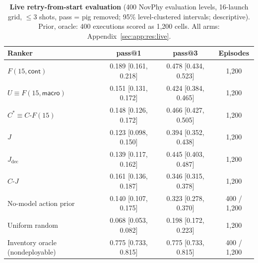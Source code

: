 \begin{table}[t]
\begin{revblock}
\centering
\footnotesize
\setlength{\tabcolsep}{3pt}
\caption{\textbf{Live retry-from-start evaluation} (400 NovPhy evaluation levels, 16-launch grid, $\le$3 shots, pass = pig removed; 95\% level-clustered intervals; descriptive). Prior, oracle: 400 executions scored as 1,200 cells. All arms: Appendix~\ref{sec:app:res:live}.}
\label{tab:res:live}
\begin{tabular}{@{}lccc@{}}
\toprule
Ranker & pass@1 & pass@3 & Episodes \\
\midrule
$F(15,\textsf{cont})$ & 0.189 [0.161, 0.218] & 0.478 [0.434, 0.523] & 1,200 \\
$U\equiv F(15,\textsf{macro})$ & 0.151 [0.131, 0.172] & 0.424 [0.384, 0.465] & 1,200 \\
$C^{*}\equiv C\text{-}F(15)$ & 0.148 [0.126, 0.172] & 0.466 [0.427, 0.505] & 1,200 \\
$J$ & 0.123 [0.098, 0.150] & 0.394 [0.352, 0.438] & 1,200 \\
$J_{\mathrm{dec}}$ & 0.139 [0.117, 0.162] & 0.445 [0.403, 0.487] & 1,200 \\
$C\text{-}J$ & 0.161 [0.136, 0.187] & 0.346 [0.315, 0.378] & 1,200 \\
No-model action prior & 0.140 [0.107, 0.175] & 0.323 [0.278, 0.370] & 400 / 1,200 \\
Uniform random & 0.068 [0.053, 0.082] & 0.198 [0.172, 0.223] & 1,200 \\
Inventory oracle (nondeployable) & 0.775 [0.733, 0.815] & 0.775 [0.733, 0.815] & 400 / 1,200 \\
\bottomrule
\end{tabular}
\end{revblock}
\end{table}

\subsection{\texorpdfstring{}{Live retry-from-start evaluation and direct success prediction}}
\label{sec:res:live}


